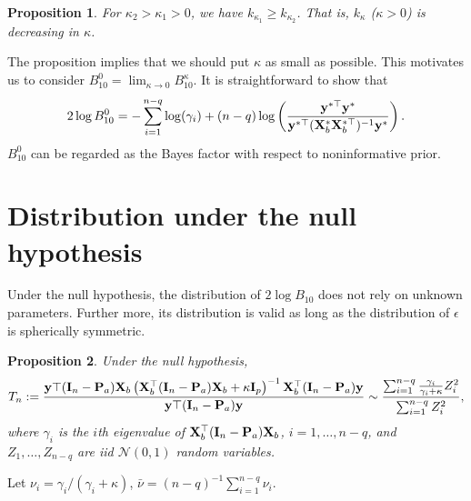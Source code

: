 \documentclass[11pt]{article}
\newcommand{\By}{\mathbf{y}}    \newcommand{\Bz}{\mathbf{z}}
\theoremstyle{plain}
\newtheorem{proposition}{\quad\quad Proposition}
\theoremstyle{definition}
\theoremstyle{remark}
\begin{document}
\begin{proposition}\label{prop:monotone}
    For $ \kappa _2 > \kappa_1 > 0$, we have
    $k_{\kappa_1} \geq k_{\kappa_2}$.
    That is, $k_{\kappa}$ ($\kappa>0$) is decreasing in $\kappa$.
\end{proposition}
The proposition implies that we should put $\kappa$ as small as possible.
This motivates us to consider $B_{10}^0=\lim_{\kappa\to 0} B_{10}^\kappa$.
It is straightforward to show that
\begin{equation*}
    2\log B_{10}^0= 
         - \sum_{i=1}^{n-q}\log ( \gamma_i )
         +(n-q)\log\left(\frac{\By^{*\top} \By^*}{\By^{*\top} ( \BX_b^* \BX_b^{*\top} )^{-1} \By^* }\right)
         .
\end{equation*}
$B_{10}^0$ can be regarded as the Bayes factor with respect to noninformative prior.

\section{Distribution under the null hypothesis}
Under the null hypothesis, the distribution of $2\log B_{10}$ does not rely on unknown parameters.
Further more, its distribution is valid as long as the distribution of $\epsilon$ is spherically symmetric.
\begin{proposition}
    Under the null hypothesis,
    \begin{equation*}
        T_n:=\frac{
            \By\top (\BI_n-\BP_a) \BX_b
            \left(\BX_b^\top  (\BI_n-\BP_a) \BX_b + \kappa \BI_p\right)^{-1}
            \BX_b^\top (\BI_n-\BP_a) \By
        }{
            \By\top (\BI_n-\BP_a) \By
        }
        \sim
        \frac{\sum_{i=1}^{n-q} \frac{\gamma_i}{\gamma_i +\kappa}Z_i^2}{\sum_{i=1}^{n-q} Z_i^2},
    \end{equation*}
    where $\gamma_i$ is the $i$th eigenvalue of $\mathbf{X}_b^\top (\mathbf{I}_n -\mathbf{P}_a) \mathbf{X}_b$, $i=1,\ldots, n-q$, and $Z_1,\ldots, Z_{n-q}$ are iid $\mathcal N(0,1)$ random variables.
\end{proposition}
Let $\nu_i={\gamma_i}/(\gamma_i +\kappa)$, $\bar \nu = (n-q)^{-1} \sum_{i=1}^{n-q} \nu_i$.
\end{document}

